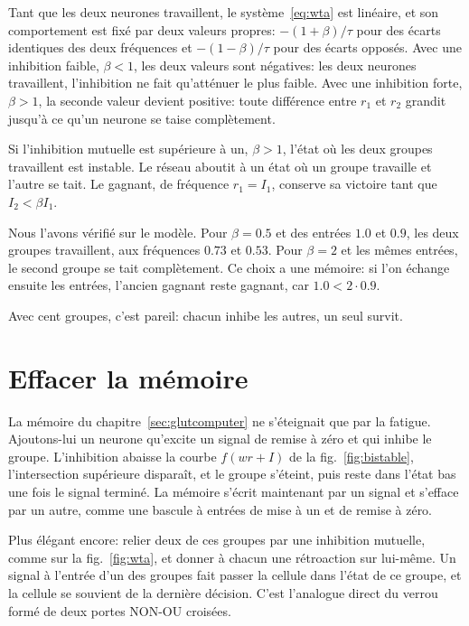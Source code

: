 Tant que les deux neurones travaillent, le système~\eqref{eq:wta} est linéaire, et son comportement est fixé par deux valeurs propres: $-(1+\beta)/\tau$ pour des écarts identiques des deux fréquences et $-(1-\beta)/\tau$ pour des écarts opposés. Avec une inhibition faible, $\beta<1$, les deux valeurs sont négatives: les deux neurones travaillent, l'inhibition ne fait qu'atténuer le plus faible. Avec une inhibition forte, $\beta>1$, la seconde valeur devient positive: toute différence entre $r_1$ et $r_2$ grandit jusqu'à ce qu'un neurone se taise complètement.

\begin{keyblock}
\begin{proposition}
\label{prop:wta}
Si l'inhibition mutuelle est supérieure à un, $\beta>1$, l'état où les deux groupes travaillent est instable. Le réseau aboutit à un état où un groupe travaille et l'autre se tait. Le gagnant, de fréquence $r_1=I_1$, conserve sa victoire tant que $I_2<\beta I_1$.
\end{proposition}
\end{keyblock}

Nous l'avons vérifié sur le modèle. Pour $\beta=0.5$ et des entrées $1.0$ et $0.9$, les deux groupes travaillent, aux fréquences $0.73$ et $0.53$. Pour $\beta=2$ et les mêmes entrées, le second groupe se tait complètement. Ce choix a une mémoire: si l'on échange ensuite les entrées, l'ancien gagnant reste gagnant, car $1.0<2\cdot0.9$.

Avec cent groupes, c'est pareil: chacun inhibe les autres, un seul survit.

\section{Effacer la mémoire}

La mémoire du chapitre~\ref{sec:glutcomputer} ne s'éteignait que par la fatigue. Ajoutons-lui un neurone  qu'excite un signal de \og remise à zéro\fg{} et qui inhibe le groupe. L'inhibition abaisse la courbe $f(wr+I)$ de la fig.~\ref{fig:bistable}, l'intersection supérieure disparaît, et le groupe s'éteint, puis reste dans l'état bas une fois le signal terminé. La mémoire s'écrit maintenant par un signal et s'efface par un autre, comme une bascule à entrées de mise à un et de remise à zéro.

Plus élégant encore: relier deux de ces groupes par une inhibition mutuelle, comme sur la fig.~\ref{fig:wta}, et donner à chacun une rétroaction sur lui-même. Un signal à l'entrée d'un des groupes fait passer la cellule dans l'état de ce groupe, et la cellule se souvient de la dernière décision. C'est l'analogue direct du verrou formé de deux portes NON-OU croisées.

